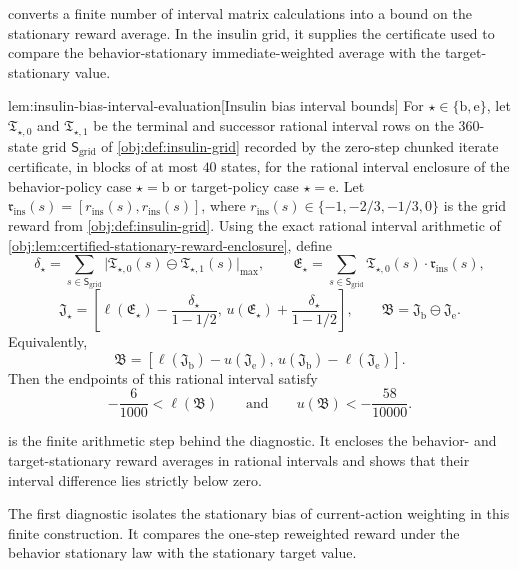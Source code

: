  converts a finite number of interval matrix calculations into a bound on the stationary reward average. In the insulin grid, it supplies the certificate used to compare the behavior-stationary immediate-weighted average with the target-stationary value.

\begin{lemmav}{lem:insulin-bias-interval-evaluation}[Insulin bias interval bounds]
For \(\star\in\{\mathrm b,\mathrm e\}\), let \(\mathfrak T_{\star,0}\) and \(\mathfrak T_{\star,1}\) be the terminal and successor rational interval rows on the \(360\)-state grid \(\mathsf S_{\mathrm{grid}}\) of \cref{obj:def:insulin-grid} recorded by the zero-step chunked iterate certificate, in blocks of at most \(40\) states, for the rational interval enclosure of the behavior-policy case \(\star=\mathrm b\) or target-policy case \(\star=\mathrm e\). Let \(\mathfrak r_{\mathrm{ins}}(s)=[r_{\mathrm{ins}}(s),r_{\mathrm{ins}}(s)]\), where \(r_{\mathrm{ins}}(s)\in\{-1,-2/3,-1/3,0\}\) is the grid reward from \cref{obj:def:insulin-grid}. Using the exact rational interval arithmetic of \cref{obj:lem:certified-stationary-reward-enclosure}, define
\[
\delta_\star=\sum_{s\in\mathsf S_{\mathrm{grid}}}\bigl|\mathfrak T_{\star,0}(s)\ominus\mathfrak T_{\star,1}(s)\bigr|_{\max},
\qquad
\mathfrak E_\star=\sum_{s\in\mathsf S_{\mathrm{grid}}}\mathfrak T_{\star,0}(s)\cdot\mathfrak r_{\mathrm{ins}}(s),
\]
\[
\mathfrak J_\star=
\left[
\ell(\mathfrak E_\star)-\frac{\delta_\star}{1-1/2},
\,
u(\mathfrak E_\star)+\frac{\delta_\star}{1-1/2}
\right],
\qquad
\mathfrak B=\mathfrak J_{\mathrm b}\ominus\mathfrak J_{\mathrm e}.
\]
Equivalently,
\[
\mathfrak B=
\left[
\ell(\mathfrak J_{\mathrm b})-u(\mathfrak J_{\mathrm e}),
\,
u(\mathfrak J_{\mathrm b})-\ell(\mathfrak J_{\mathrm e})
\right].
\]
Then the endpoints of this rational interval satisfy
\[
-\frac{6}{1000}<\ell(\mathfrak B)
\qquad\text{and}\qquad
u(\mathfrak B)<-\frac{58}{10000}.
\]
\end{lemmav}

 is the finite arithmetic step behind the diagnostic. It encloses the behavior- and target-stationary reward averages in rational intervals and shows that their interval difference lies strictly below zero.

The first diagnostic isolates the stationary bias of current-action weighting in this finite construction. It compares the one-step reweighted reward under the behavior stationary law with the stationary target value.

